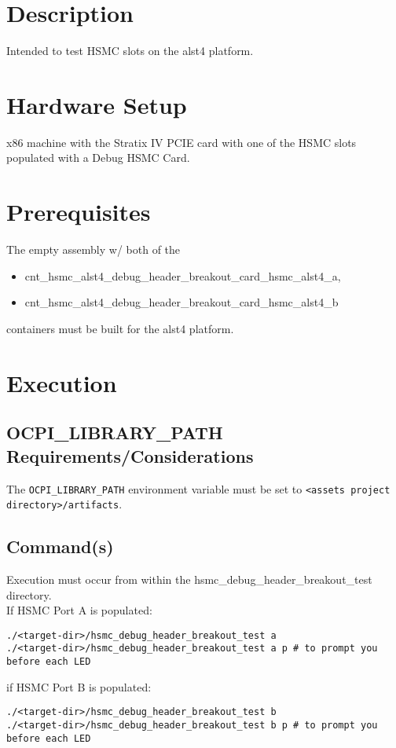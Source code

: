 \section{Description}
Intended to test HSMC slots on the alst4 platform.
\section{Hardware Setup}
x86 machine with the Stratix IV PCIE card with one of the HSMC slots populated with a Debug HSMC Card\cite{debugcard}.
\section{Prerequisites}
The empty assembly w/ both of the
\begin{itemize}
  \item cnt\_hsmc\_alst4\_debug\_header\_breakout\_card\_hsmc\_alst4\_a,
  \item cnt\_hsmc\_alst4\_debug\_header\_breakout\_card\_hsmc\_alst4\_b
\end{itemize}
containers must be built for the alst4 platform.
\section{Execution}
\subsection{OCPI\_LIBRARY\_PATH Requirements/Considerations}
The \verb+OCPI_LIBRARY_PATH+ environment variable must be set to \verb+<assets project directory>/artifacts+.
\subsection{Command(s)}
Execution must occur from within the hsmc\_debug\_header\_breakout\_test directory. \\
If HSMC Port A is populated:
\begin{lstlisting}
./<target-dir>/hsmc_debug_header_breakout_test a
./<target-dir>/hsmc_debug_header_breakout_test a p # to prompt you before each LED
\end{lstlisting}
if HSMC Port B is populated:
\begin{lstlisting}
./<target-dir>/hsmc_debug_header_breakout_test b
./<target-dir>/hsmc_debug_header_breakout_test b p # to prompt you before each LED
\end{lstlisting}
